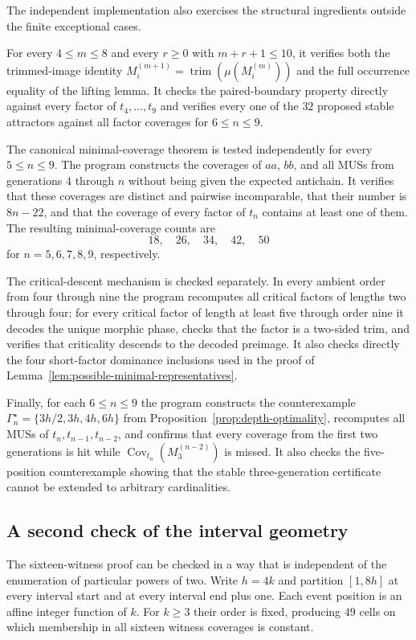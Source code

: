 \documentclass[11pt,a4paper]{article}
\theoremstyle{definition}\newtheorem{definition}[theorem]{Definition}
\theoremstyle{remark}\newtheorem{remark}[theorem]{Remark}
\newcommand{\Cov}{\operatorname{Cov}}
\begin{document}
The independent implementation also exercises the structural ingredients outside the finite exceptional cases.

For every $4\le m\le8$ and every $r\ge0$ with $m+r+1\le10$, it verifies both the trimmed-image identity
$
 M_i^{(m+1)}=\operatorname{trim}(\mu(M_i^{(m)}))
$
and the full occurrence equality of the lifting lemma.  It checks the paired-boundary property directly against every factor of $t_4,\ldots,t_9$ and verifies every one of the $32$ proposed stable attractors against all factor coverages for $6\le n\le9$.

The canonical minimal-coverage theorem is tested independently for every $5\le n\le9$.  The program constructs the coverages of $aa$, $bb$, and all MUSs from generations $4$ through $n$ without being given the expected antichain.  It verifies that these coverages are distinct and pairwise incomparable, that their number is $8n-22$, and that the coverage of every factor of $t_n$ contains at least one of them.  The resulting minimal-coverage counts are
\[
 18,\quad26,\quad34,\quad42,\quad50
\]
for $n=5,6,7,8,9$, respectively.

The critical-descent mechanism is checked separately.  In every ambient order from four through nine the program recomputes all critical factors of lengths two through four; for every critical factor of length at least five through order nine it decodes the unique morphic phase, checks that the factor is a two-sided trim, and verifies that criticality descends to the decoded preimage.  It also checks directly the four short-factor dominance inclusions used in the proof of Lemma~\ref{lem:possible-minimal-representatives}.

Finally, for each $6\le n\le9$ the program constructs the counterexample
$
 \Gamma_n^\star=\{3h/2,3h,4h,6h\}
$
from Proposition~\ref{prop:depth-optimality}, recomputes all MUSs of $t_n,t_{n-1},t_{n-2}$, and confirms that every coverage from the first two generations is hit while $\Cov_{t_n}(M_3^{(n-2)})$ is missed.  It also checks the five-position counterexample showing that the stable three-generation certificate cannot be extended to arbitrary cardinalities.

\subsection{A second check of the interval geometry}
\label{subsec:parametric-check}

The sixteen-witness proof can be checked in a way that is independent of the enumeration of particular powers of two.  Write $h=4k$ and partition $[1,8h]$ at every interval start and at every interval end plus one.  Each event position is an affine integer function of $k$.  For $k\ge3$ their order is fixed, producing $49$ cells on which membership in all sixteen witness coverages is constant.
\end{document}
